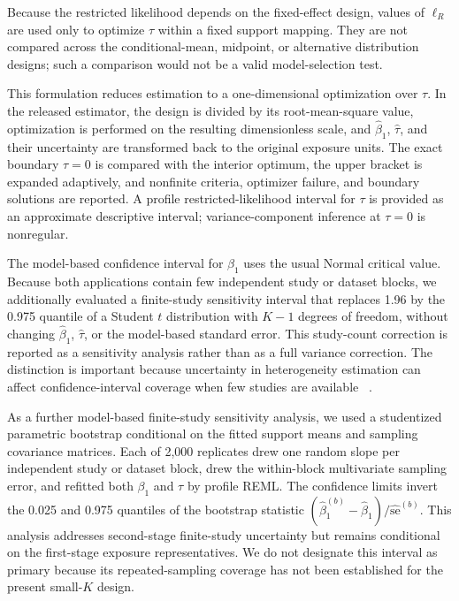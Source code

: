 \documentclass[journal=rsm]{CUP-JNL-DTM}%
\theoremstyle{definition}
\numberwithin{equation}{section}
\begin{document}
%
Because the restricted likelihood depends on the fixed-effect design, values
of $\ell_R$ are used only to optimize $\tau$ within a fixed support mapping.
They are not compared across the conditional-mean, midpoint, or alternative
distribution designs; such a comparison would not be a valid model-selection
test.

This formulation reduces estimation to a one-dimensional optimization over
$\tau$. In the released estimator, the design is divided by its root-mean-square
value, optimization is performed on the resulting dimensionless scale, and
$\hat\beta_1$, $\hat\tau$, and their uncertainty are transformed back to the
original exposure units. The exact boundary $\tau=0$ is compared with the
interior optimum, the upper bracket is expanded adaptively, and nonfinite
criteria, optimizer failure, and boundary solutions are reported. A profile
restricted-likelihood interval for $\tau$ is provided as an approximate
descriptive interval; variance-component inference at $\tau=0$ is nonregular.

The model-based confidence interval for $\beta_1$ uses the usual Normal
critical value. Because both applications contain few independent study or
dataset blocks, we additionally evaluated a finite-study sensitivity interval
that replaces 1.96 by the 0.975 quantile of a Student $t$ distribution with
$K-1$ degrees of freedom, without changing $\hat\beta_1$, $\hat\tau$, or the
model-based standard error. This study-count correction is reported as a
sensitivity analysis rather than as a full variance correction. The distinction
is important because uncertainty in heterogeneity estimation can affect
confidence-interval coverage when few studies are available
~\cite{Partlett2017,Duan2025}.

As a further model-based finite-study sensitivity analysis, we used a studentized
parametric bootstrap conditional on the fitted support means and sampling
covariance matrices. Each of 2,000 replicates drew one random slope per
independent study or dataset block, drew the within-block multivariate sampling
error, and refitted both $\beta_1$ and $\tau$ by profile REML. The confidence
limits invert the 0.025 and 0.975 quantiles of the bootstrap statistic
$(\hat\beta_1^{(b)}-\hat\beta_1)/\widehat{\mathrm{se}}^{(b)}$. This analysis
addresses second-stage finite-study uncertainty but remains conditional on the
first-stage exposure representatives. We do not designate this interval as
primary because its repeated-sampling coverage has not been established for the
present small-$K$ design.
\end{document}
